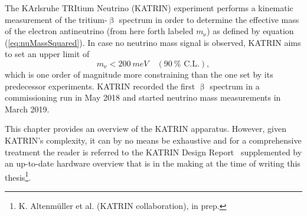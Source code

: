 The KArlsruhe TRItium Neutrino (KATRIN) experiment performs a kinematic measurement of the tritium-$\upbeta$ spectrum in order to determine the effective mass of the electron antineutrino (from here forth labeled $m_\upnu$) as defined by equation (\ref{eq:nuMassSquared}). In case no neutrino mass signal is observed, KATRIN aims to set an upper limit of
\begin{equation*}
m_\upnu < \SI{200}{meV} \quad (\SI{90}{\percent} \text{ C.L.})
\comma
\end{equation*}
which is one order of magnitude more constraining than the one set by its predecessor experiments.
KATRIN recorded the first $\upbeta$ spectrum in a commissioning run in May 2018 and started neutrino mass measurements in March 2019.

This chapter provides an overview of the KATRIN apparatus. However, given KATRIN's complexity, it can by no means be exhaustive and for a comprehensive treatment the reader is referred to the KATRIN Design Report~\cite{Angrik:2005ep} supplemented by an up-to-date hardware overview that is in the making at the time of writing this thesis\footnote{K. Altenmüller et al. (KATRIN collaboration), in prep.}.